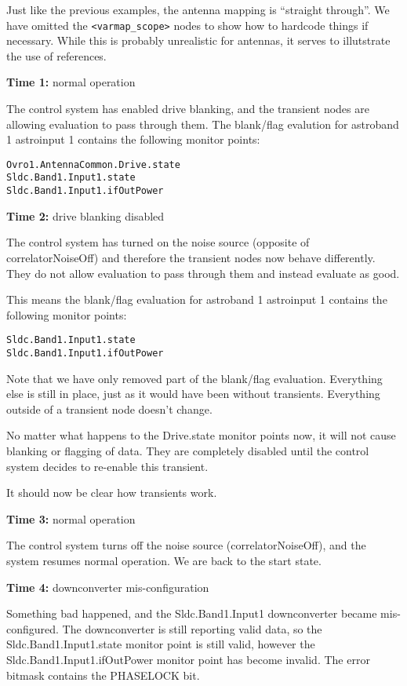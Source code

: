 \documentclass[letterpaper,12pt,oneside,pdftex]{article}
\newcommand{\mytime}[2]{\textbf{Time #1:} #2}
\begin{document}
Just like the previous examples, the antenna mapping is ``straight through''. We
have omitted the \verb|<varmap_scope>| nodes to show how to hardcode things if
necessary. While this is probably unrealistic for antennas, it serves to
illutstrate the use of references.

\mytime{1}{normal operation}

The control system has enabled drive blanking, and the transient nodes are
allowing evaluation to pass through them. The blank/flag evalution for astroband
1 astroinput 1 contains the following monitor points:

\begin{verbatim}
Ovro1.AntennaCommon.Drive.state
Sldc.Band1.Input1.state
Sldc.Band1.Input1.ifOutPower
\end{verbatim}

\mytime{2}{drive blanking disabled}

The control system has turned on the noise source (opposite of
correlatorNoiseOff) and therefore the transient nodes now behave differently.
They do not allow evaluation to pass through them and instead evaluate as good.

This means the blank/flag evaluation for astroband 1 astroinput 1 contains
the following monitor points:

\begin{verbatim}
Sldc.Band1.Input1.state
Sldc.Band1.Input1.ifOutPower
\end{verbatim}

Note that we have only removed part of the blank/flag evaluation. Everything
else is still in place, just as it would have been without transients.
Everything outside of a transient node doesn't change.

No matter what happens to the Drive.state monitor points now, it will not cause
blanking or flagging of data. They are completely disabled until the control
system decides to re-enable this transient.

It should now be clear how transients work.

\mytime{3}{normal operation}

The control system turns off the noise source (correlatorNoiseOff), and the
system resumes normal operation. We are back to the start state.

\mytime{4}{downconverter mis-configuration}

Something bad happened, and the Sldc.Band1.Input1 downconverter became
mis-configured. The downconverter is still reporting valid data, so the
Sldc.Band1.Input1.state monitor point is still valid, however the
Sldc.Band1.Input1.ifOutPower monitor point has become invalid. The error bitmask
contains the PHASELOCK bit.
\end{document}
